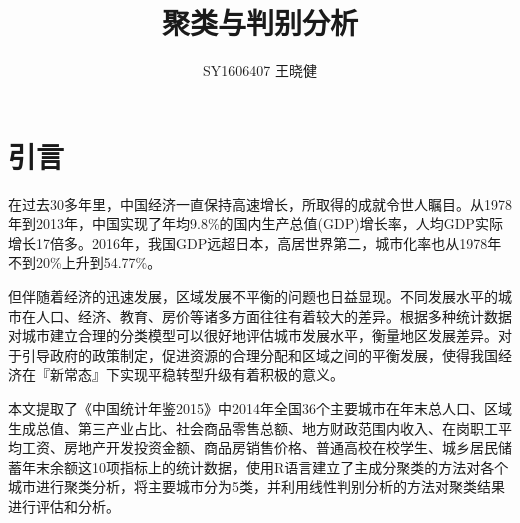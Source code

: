 \documentclass [a4paper]{article}
\author {SY1606407 王晓健}
\title {聚类与判别分析}
\begin{document}
\maketitle
\section{引言}
在过去30多年里，中国经济一直保持高速增长，所取得的成就令世人瞩目。从1978年到2013年，中国实现了年均9.8\%的国内生产总值(GDP)增长率，人均GDP实际增长17倍多。2016年，我国GDP远超日本，高居世界第二，城市化率也从1978年不到20\%上升到54.77\%。

但伴随着经济的迅速发展，区域发展不平衡的问题也日益显现。不同发展水平的城市在人口、经济、教育、房价等诸多方面往往有着较大的差异。根据多种统计数据对城市建立合理的分类模型可以很好地评估城市发展水平，衡量地区发展差异。对于引导政府的政策制定，促进资源的合理分配和区域之间的平衡发展，使得我国经济在『新常态』下实现平稳转型升级有着积极的意义。

本文提取了《中国统计年鉴2015》中2014年全国36个主要城市在年末总人口、区域生成总值、第三产业占比、社会商品零售总额、地方财政范围内收入、在岗职工平均工资、房地产开发投资金额、商品房销售价格、普通高校在校学生、城乡居民储蓄年末余额这10项指标上的统计数据，使用R语言建立了主成分聚类的方法对各个城市进行聚类分析，将主要城市分为5类，并利用线性判别分析的方法对聚类结果进行评估和分析。
\end{document}
